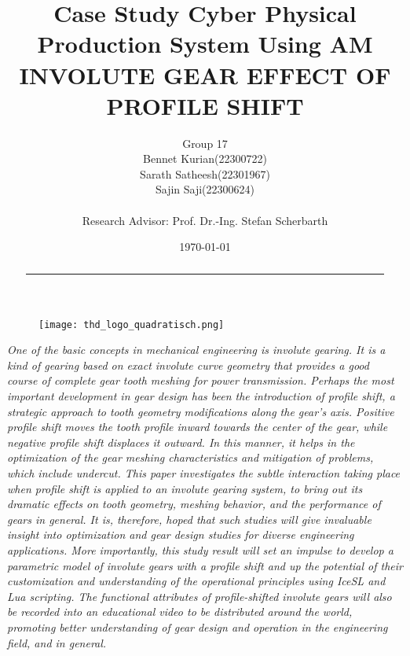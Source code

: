 \documentclass{article}
\title{\vspace{0.5cm} Case Study Cyber Physical Production System Using AM\vspace{2cm}\\
\Huge INVOLUTE GEAR EFFECT OF PROFILE SHIFT}\vspace{2cm}
\author{\vspace{2mm}Group 17\\
Bennet Kurian(22300722) \\
Sarath Satheesh(22301967) \\
Sajin Saji(22300624) \vspace{2cm}\\
\vspace{2cm}\\
\Large Research Advisor: Prof. Dr.-Ing. Stefan Scherbarth}
\date{\vspace{1cm}\today}
\begin{document}
\thispagestyle{empty}
\begin{figure}
    \centering
    \texttt{[image: thd\_logo\_quadratisch.png]}
\end{figure}

\maketitle

\thispagestyle{empty}
\vspace{3cm}
\begin{abstract}   \hrule
\end{abstract}
    \emph{
    One of the basic concepts in mechanical engineering is involute gearing. It is a kind of gearing based on exact involute curve geometry that provides a good course of complete gear tooth meshing for power transmission. Perhaps the most important development in gear design has been the introduction of profile shift, a strategic approach to tooth geometry modifications along the gear's axis. Positive profile shift moves the tooth profile inward towards the center of the gear, while negative profile shift displaces it outward. In this manner, it helps in the optimization of the gear meshing characteristics and mitigation of problems, which include undercut. This paper investigates the subtle interaction taking place when profile shift is applied to an involute gearing system, to bring out its dramatic effects on tooth geometry, meshing behavior, and the performance of gears in general. It is, therefore, hoped that such studies will give invaluable insight into optimization and gear design studies for diverse engineering applications. More importantly, this study result will set an impulse to develop a parametric model of involute gears with a profile shift and up the potential of their customization and understanding of the operational principles using IceSL and Lua scripting. The functional attributes of profile-shifted involute gears will also be recorded into an educational video to be distributed around the world, promoting better understanding of gear design and operation in the engineering field, and in general.\\}
    
\end{document}
